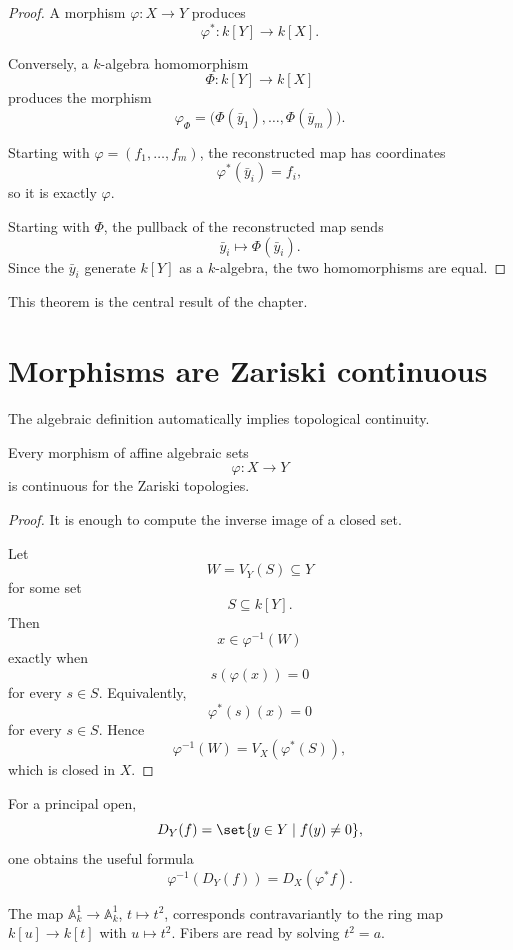 \begin{proof}
A morphism \(\varphi:X\to Y\) produces
\[
\varphi^\ast:k[Y]\to k[X].
\]

Conversely, a \(k\)-algebra homomorphism
\[
\Phi:k[Y]\to k[X]
\]
produces the morphism
\[
\varphi_\Phi
=
\bigl(
\Phi(\bar y_1),\dots,\Phi(\bar y_m)
\bigr).
\]

Starting with \(\varphi=(f_1,\dots,f_m)\), the reconstructed map has coordinates
\[
\varphi^\ast(\bar y_i)=f_i,
\]
so it is exactly \(\varphi\).

Starting with \(\Phi\), the pullback of the reconstructed map sends
\[
\bar y_i\longmapsto \Phi(\bar y_i).
\]
Since the \(\bar y_i\) generate \(k[Y]\) as a \(k\)-algebra, the two homomorphisms are equal.
\end{proof}

This theorem is the central result of the chapter.

\section{Morphisms are Zariski continuous}

The algebraic definition automatically implies topological continuity.

\begin{theorem}
\label{thm:vi04-continuity}
Every morphism of affine algebraic sets
\[
\varphi:X\to Y
\]
is continuous for the Zariski topologies.
\end{theorem}

\begin{proof}
It is enough to compute the inverse image of a closed set.

Let
\[
W=V_Y(S)\subseteq Y
\]
for some set
\[
S\subseteq k[Y].
\]
Then
\[
x\in\varphi^{-1}(W)
\]
exactly when
\[
s(\varphi(x))=0
\]
for every \(s\in S\).  Equivalently,
\[
\varphi^\ast(s)(x)=0
\]
for every \(s\in S\).  Hence
\[
\varphi^{-1}(W)
=
V_X(\varphi^\ast(S)),
\]
which is closed in \(X\).
\end{proof}

For a principal open,
\[
D_Y(f)=\set{y\in Y\mid f(y)\neq0},
\]
one obtains the useful formula
\[
\varphi^{-1}(D_Y(f))
=
D_X(\varphi^\ast f).
\]

\begin{example}\label{ex:vi04-expand-02}
The map $\mathbb A^1_k\to\mathbb A^1_k$, $t\mapsto t^2$, corresponds contravariantly to the ring map $k[u]\to k[t]$ with $u\mapsto t^2$.  Fibers are read by solving $t^2=a$.
\end{example}
